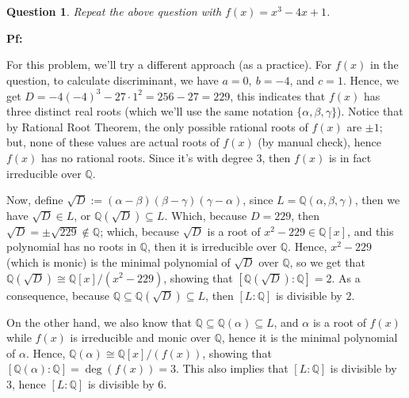 \documentclass{article}
\newtheorem{question}{Question}
\newcommand{\QQ}{\mathbb{Q}}
\begin{document}
\break

\section{}%
\begin{question}\label{q3}
    Repeat the above question with $f(x)=x^3-4x+1$.
\end{question}

\textbf{Pf:}

For this problem, we'll try a different approach (as a practice). For $f(x)$ in the question, to calculate discriminant, we have $a=0,\ b=-4$, and $c=1$. Hence, we get $D = -4(-4)^3-27\cdot 1^2 = 256 - 27 = 229$, this indicates that $f(x)$ has three distinct real roots (which we'll use the same notation $\{\alpha,\beta,\gamma\}$). Notice that by Rational Root Theorem, the only possible rational roots of $f(x)$ are $\pm 1$; but, none of these values are actual roots of $f(x)$ (by manual check), hence $f(x)$ has no rational roots. Since it's with degree $3$, then $f(x)$ is in fact irreducible over $\QQ$.

Now, define $\sqrt{D}:=(\alpha-\beta)(\beta-\gamma)(\gamma-\alpha)$, since $L=\QQ(\alpha,\beta,\gamma)$, then we have $\sqrt{D}\in L$, or $\QQ(\sqrt{D})\subseteq L$. Which, because $D=229$, then $\sqrt{D}=\pm \sqrt{229}\notin \QQ$; which, because $\sqrt{D}$ is a root of $x^2-229\in \QQ[x]$, and this polynomial has no roots in $\QQ$, then it is irreducible over $\QQ$. Hence, $x^2-229$ (which is monic) is the minimal polynomial of $\sqrt{D}$ over $\mathbb{Q}$, so we get that $\QQ(\sqrt{D})\cong \QQ[x]/(x^2-229)$, showing that $[\QQ(\sqrt{D}):\QQ]=2$. As a consequence, because $\QQ\subseteq \QQ(\sqrt{D})\subseteq L$, then $[L:\QQ]$ is divisible by $2$.

On the other hand, we also know that $\QQ\subseteq\QQ(\alpha)\subseteq L$, and $\alpha$ is a root of $f(x)$ while $f(x)$ is irreducible and monic over $\QQ$, hence it is the minimal polynomial of $\alpha$. Hence, $\QQ(\alpha)\cong \QQ[x]/(f(x))$, showing that $[\QQ(\alpha):\QQ]=\deg(f(x))=3$. This also implies that $[L:\QQ]$ is divisible by $3$, hence $[L:\QQ]$ is divisible by $6$.
\end{document}
